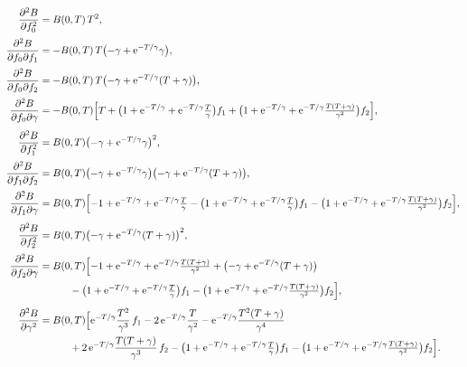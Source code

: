 \documentclass[12pt]{article}
\begin{document}
\begin{align}
\frac{\partial^{2}B}{\partial f_0^{2}}
  &= B(0,T)\,T^{2}, \\[0.2em]
\frac{\partial^{2}B}{\partial f_0\partial f_1}
  &= -B(0,T)\,T\bigl(-\gamma+\mathrm{e}^{-T/\gamma}\gamma\bigr), \\[0.2em]
\frac{\partial^{2}B}{\partial f_0\partial f_2}
  &= -B(0,T)\,T\bigl(-\gamma+\mathrm{e}^{-T/\gamma}(T+\gamma)\bigr), \\[0.2em]
\frac{\partial^{2}B}{\partial f_0\partial\gamma}
  &= -B(0,T)\Bigl[
        T
        +\bigl(1+\mathrm{e}^{-T/\gamma}
               +\mathrm{e}^{-T/\gamma}\tfrac{T}{\gamma}\bigr)f_1
        +\bigl(1+\mathrm{e}^{-T/\gamma}
               +\mathrm{e}^{-T/\gamma}\tfrac{T(T+\gamma)}{\gamma^{2}}\bigr)f_2
      \Bigr], \\[0.4em]
\frac{\partial^{2}B}{\partial f_1^{2}}
  &= B(0,T)\bigl(-\gamma+\mathrm{e}^{-T/\gamma}\gamma\bigr)^{2}, \\[0.2em]
\frac{\partial^{2}B}{\partial f_1\partial f_2}
  &= B(0,T)\bigl(-\gamma+\mathrm{e}^{-T/\gamma}\gamma\bigr)
               \bigl(-\gamma+\mathrm{e}^{-T/\gamma}(T+\gamma)\bigr), \\[0.2em]
\frac{\partial^{2}B}{\partial f_1\partial\gamma}
  &= B(0,T)\Bigl[
        -1+\mathrm{e}^{-T/\gamma}
        +\mathrm{e}^{-T/\gamma}\tfrac{T}{\gamma}
        -\bigl(1+\mathrm{e}^{-T/\gamma}
               +\mathrm{e}^{-T/\gamma}\tfrac{T}{\gamma}\bigr)f_1
        -\bigl(1+\mathrm{e}^{-T/\gamma}
               +\mathrm{e}^{-T/\gamma}\tfrac{T(T+\gamma)}{\gamma^{2}}\bigr)f_2
      \Bigr], \\[0.4em]
\frac{\partial^{2}B}{\partial f_2^{2}}
  &= B(0,T)\bigl(-\gamma+\mathrm{e}^{-T/\gamma}(T+\gamma)\bigr)^{2}, \\[0.2em]
\frac{\partial^{2}B}{\partial f_2\partial\gamma}
  &= B(0,T)\Bigl[
        -1+\mathrm{e}^{-T/\gamma}
        +\mathrm{e}^{-T/\gamma}\tfrac{T(T+\gamma)}{\gamma^{2}}
        +\bigl(-\gamma+\mathrm{e}^{-T/\gamma}(T+\gamma)\bigr) \\
  &\qquad\quad
        -\bigl(1+\mathrm{e}^{-T/\gamma}
               +\mathrm{e}^{-T/\gamma}\tfrac{T}{\gamma}\bigr)f_1
        -\bigl(1+\mathrm{e}^{-T/\gamma}
               +\mathrm{e}^{-T/\gamma}\tfrac{T(T+\gamma)}{\gamma^{2}}\bigr)f_2
      \Bigr], \\[0.4em]
\frac{\partial^{2}B}{\partial\gamma^{2}}
  &= B(0,T)\Bigl[
        \mathrm{e}^{-T/\gamma}\frac{T^{2}}{\gamma^{3}}\,f_1
      - 2\,\mathrm{e}^{-T/\gamma}\frac{T}{\gamma^{2}}
      - \mathrm{e}^{-T/\gamma}\frac{T^{2}(T+\gamma)}{\gamma^{4}} \\
  &\qquad\quad
      + 2\,\mathrm{e}^{-T/\gamma}\frac{T(T+\gamma)}{\gamma^{3}}\,f_2
      - \bigl(1+\mathrm{e}^{-T/\gamma}
              +\mathrm{e}^{-T/\gamma}\tfrac{T}{\gamma}\bigr)f_1
      - \bigl(1+\mathrm{e}^{-T/\gamma}
              +\mathrm{e}^{-T/\gamma}\tfrac{T(T+\gamma)}{\gamma^{2}}\bigr)f_2
      \Bigr].
\end{align}
\end{document}

